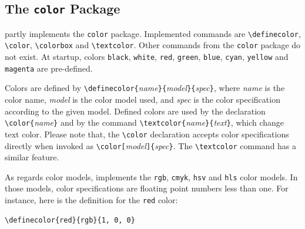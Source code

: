 \subsection{The \texttt{color} Package}%
\label{color}\label{color:package}%
\newcommand{\showcolor}[1]{\texttt{#1}}
\hevea{} partly implements the \texttt{color} package.
Implemented commands are \verb+\definecolor+, \verb+\color+,
\verb+\colorbox+ and
\verb+\textcolor+. Other commands from the \texttt{color} package do
not exist.
At startup,
colors \showcolor{black}, \showcolor{white},
\showcolor{red}, \showcolor{green}, \showcolor{blue},
\showcolor{cyan}, \showcolor{yellow} and \showcolor{magenta} are
pre-defined.

Colors are defined by
\verb+\definecolor{+\textit{name}\verb+}{+\textit{model}\verb+}{+\textit{spec}\verb+}+,
where \textit{name} is the color name, \textit{model} is the color
model used, and \textit{spec} is the color specification according to
the given model.
Defined colors are used by the declaration
\verb+\color{+\textit{name}\verb+}+ and by the command
\verb+\textcolor{+\textit{name}\verb+}{+\textit{text}\verb+}+, which
change text color.
Please note that, the \verb+\color+ declaration
accepts color specifications directly
when invoked as
\verb+\color[+\textit{model}\verb+]{+\textit{spec}\verb+}+.
The \verb+\textcolor+ command has a similar feature.

As regards color models, \hevea{} implements the \texttt{rgb},
\texttt{cmyk}, \texttt{hsv} and \texttt{hls} color models.
In those models, color specifications are floating point numbers less
than one.
For instance, here is the definition for the \texttt{red} color:
\begin{verbatim}
\definecolor{red}{rgb}{1, 0, 0}
\end{verbatim}


